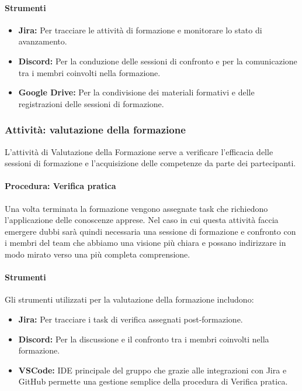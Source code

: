 \documentclass[a4paper,12pt]{article}
\begin{document}
\paragraph{Strumenti}
\begin{itemize}
    \item \textbf{Jira:} Per tracciare le attività di formazione e monitorare lo stato di avanzamento.
    \item \textbf{Discord:} Per la conduzione delle sessioni di confronto e per la comunicazione tra i membri coinvolti nella formazione.
    \item \textbf{Google Drive:} Per la condivisione dei materiali formativi e delle registrazioni delle sessioni di formazione.
\end{itemize}

\subsubsection{Attività: valutazione della formazione}
L'attività di Valutazione della Formazione serve a verificare l'efficacia delle
sessioni di formazione e l'acquisizione delle competenze da parte dei
partecipanti.
\paragraph{Procedura: Verifica pratica}
Una volta terminata la formazione vengono assegnate
task che richiedono l'applicazione delle conoscenze apprese. Nel caso in cui
questa attività faccia emergere dubbi sarà quindi necessaria una sessione di
formazione e confronto con i membri del team che abbiamo una visione più chiara
e possano indirizzare in modo mirato verso una più completa comprensione.

\paragraph{Strumenti}
Gli strumenti utilizzati per la valutazione della formazione includono:
\begin{itemize}
    \item \textbf{Jira:} Per tracciare i task di verifica assegnati post-formazione.
    \item \textbf{Discord:} Per la discussione e il confronto tra i membri coinvolti nella formazione.
    \item \textbf{VSCode:} IDE principale del gruppo che grazie alle integrazioni con Jira e GitHub permette una gestione semplice della procedura di Verifica pratica.
\end{itemize}
\end{document}
